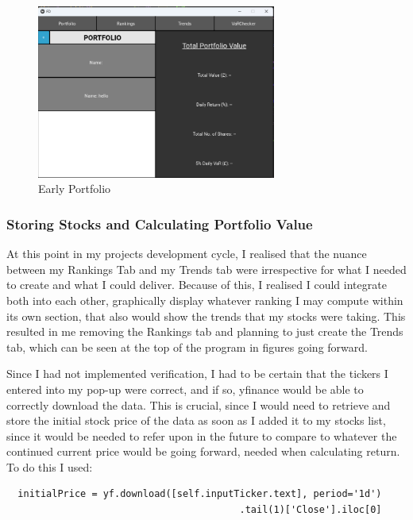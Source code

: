 \documentclass{article}
\begin{document}
\begin{figure}[h]
  \centering
  \includegraphics[width=0.7\textwidth]{Images/Term 2 Images/image (16).png}
  \caption{Early Portfolio}
  \label{fig:Early Portfolio}
\end{figure}

\subsubsection{Storing Stocks and Calculating Portfolio Value}
At this point in my projects development cycle, I realised that the nuance between my Rankings Tab and my Trends tab were irrespective for what I needed to create and what I could deliver. Because of this, I realised I could integrate both into each other, graphically display whatever ranking I may compute within its own section, that also would show the trends that my stocks were taking. This resulted in me removing the Rankings tab and planning to just create the Trends tab, which can be seen at the top of the program in figures going forward.\\\vspace{0.3cm}

Since I had not implemented verification, I had to be certain that the tickers I entered into my pop-up were correct, and if so, yfinance would be able to correctly download the data. This is crucial, since I would need to retrieve and store the initial stock price of the data as soon as I added it to my stocks list, since it would be needed to refer upon in the future to compare to whatever the continued current price would be going forward, needed when calculating return. To do this I used:\\\vspace{0.3cm}

\begin{verbatim}
  initialPrice = yf.download([self.inputTicker.text], period='1d')
                                         .tail(1)['Close'].iloc[0]
\end{verbatim}
\end{document}
